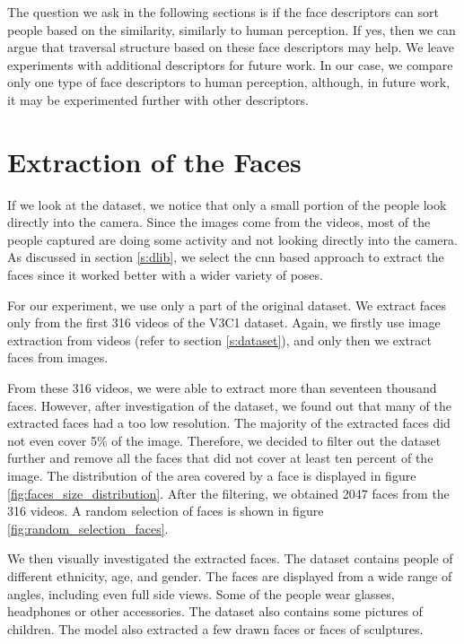 The question we ask in the following sections is if the face descriptors can sort people based on the similarity, similarly to human perception. If yes, then we can argue that traversal structure based on these face descriptors may help. We leave experiments with additional descriptors for future work. In our case, we compare only one type of face descriptors to human perception, although, in future work, it may be experimented further with other descriptors.

\section{Extraction of the Faces}

If we look at the dataset, we notice that only a small portion of the people look directly into the camera. Since the images come from the videos, most of the people captured are doing some activity and not looking directly into the camera. As discussed in section \ref{s:dlib}, we select the \acrshort{cnn} based approach to extract the faces since it worked better with a wider variety of poses.

For our experiment, we use only a part of the original dataset. We extract faces only from the first 316 videos of the V3C1 dataset. Again, we firstly use image extraction from videos (refer to section \ref{s:dataset}), and only then we extract faces from images. 

From these 316 videos, we were able to extract more than seventeen thousand faces. However, after investigation of the dataset, we found out that many of the extracted faces had a too low resolution. The majority of the extracted faces did not even cover 5\% of the image. Therefore, we decided to filter out the dataset further and remove all the faces that did not cover at least ten percent of the image. The distribution of the area covered by a face is displayed in figure \ref{fig:faces_size_distribution}. After the filtering,  we obtained 2047 faces from the 316 videos. A random selection of faces is shown in figure \ref{fig:random_selection_faces}. 

We then visually investigated the extracted faces. The dataset contains people of different ethnicity, age, and gender. The faces are displayed from a wide range of angles, including even full side views. Some of the people wear glasses, headphones or other accessories. The dataset also contains some pictures of children. The model also extracted a few drawn faces or faces of sculptures.

